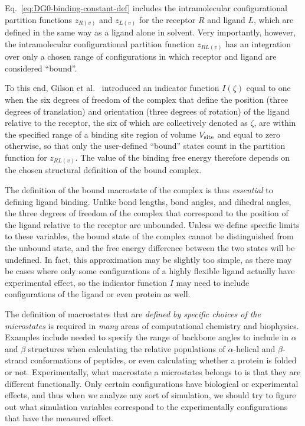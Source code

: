 \documentclass[9pt,bestpractices]{livecoms}
\begin{document}
Eq.~\ref{eq:DG0-binding-constant-def} includes the intramolecular configurational partition functions $z_{R(v)}$ and $z_{L(v)}$ for the receptor $R$ and ligand $L$, which are defined in the same way as a ligand alone in solvent. Very importantly, however, the intramolecular configurational partition function $z_{RL(v)}$ has an integration over only a chosen range of configurations in which receptor and ligand are considered ``bound''.

To this end, Gilson et al.~\cite{gilson1997statisticalthermodynamic} introduced an indicator function $I(\zeta)$ equal to one when the six degrees of freedom of the complex that define the position (three degrees of translation) and orientation (three degrees of rotation) of the ligand relative to the receptor, the six of which are collectively denoted as $\zeta$, are within the specified range of a binding site region of volume $V_{\rm site}$ and equal to zero otherwise, so that only the user-defined ``bound'' states count in the partition function for $z_{RL(v)}$.  The value of the binding free energy therefore depends on the chosen structural definition of the bound complex.

The definition of the bound macrostate of the complex is thus \textit{essential} to defining ligand binding.  Unlike bond lengths, bond angles, and dihedral angles, the three degrees of freedom of the complex that correspond to the position of the ligand relative to the receptor are unbounded. Unless we define specific limits to these variables, the bound state of the complex cannot be distinguished from the unbound state, and the free energy difference between the two states will be undefined.  In fact, this approximation may be slightly too simple, as there may be cases where only some configurations of a highly flexible ligand actually have experimental effect, so the indicator function $I$ may need to include configurations of the ligand or even protein as well. 

The definition of macrostates that are \textit{defined by specific choices of the microstates} is required in \textit{many} areas of computational chemistry and biophysics. Examples include needed to specify the range of backbone angles to include in $\alpha$ and $\beta$ structures when calculating  the relative populations of $\alpha$-helical and $\beta$-strand conformations of peptides, or even calculating whether a protein is folded or not. Experimentally, what macrostate a microstates belongs to is that they are different functionally. Only certain configurations have biological or experimental effects, and thus when we analyze any sort of simulation, we should try to figure out what simulation variables correspond to the experimentally configurations that have the measured effect. 
\end{document}
